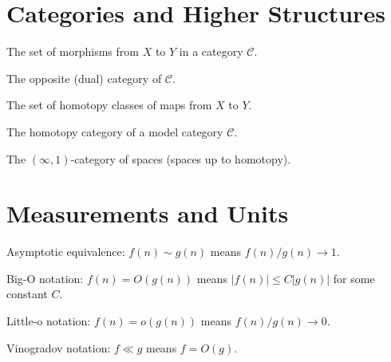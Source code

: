 \documentclass[12pt,a4paper]{book}
\theoremstyle{definition}
\theoremstyle{remark}
\begin{document}
\section*{Categories and Higher Structures}
\begin{description}[style=nextline, leftmargin=2cm]
\item[$\text{Hom}_{\mathcal{C}}(X, Y)$] The set of morphisms from $X$ to $Y$ in a category $\mathcal{C}$.
\item[$\mathcal{C}^{\text{op}}$] The opposite (dual) category of $\mathcal{C}$.
\item[{$[X, Y]$}] The set of homotopy classes of maps from $X$ to $Y$.
\item[$\text{Ho}(\mathcal{C})$] The homotopy category of a model category $\mathcal{C}$.
\item[$\infty\text{-cat}$] The $(\infty, 1)$-category of spaces (spaces up to homotopy).
\end{description}

\section*{Measurements and Units}
\begin{description}[style=nextline, leftmargin=2cm]
\item[$\sim$] Asymptotic equivalence: $f(n) \sim g(n)$ means $f(n)/g(n) \to 1$.
\item[$O(\cdot)$] Big-O notation: $f(n) = O(g(n))$ means $|f(n)| \leq C|g(n)|$ for some constant $C$.
\item[$o(\cdot)$] Little-o notation: $f(n) = o(g(n))$ means $f(n)/g(n) \to 0$.
\item[$\ll, \gg$] Vinogradov notation: $f \ll g$ means $f = O(g)$.
\end{description}

\mainmatter
















\end{document}
